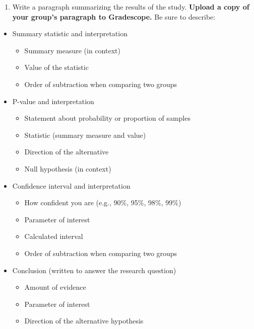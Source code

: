 \documentclass[
]{report}
\providecommand{\tightlist}{%
  \setlength{\itemsep}{0pt}\setlength{\parskip}{0pt}}
\begin{document}
\vspace{0.8in}

\begin{enumerate}
\def\labelenumi{\arabic{enumi}.}
\setcounter{enumi}{14}
\tightlist
\item
  Write a paragraph summarizing the results of the study. \textbf{Upload a copy of your group's paragraph to Gradescope.} Be sure to describe:
\end{enumerate}

\begin{itemize}
\item
  Summary statistic and interpretation

  \begin{itemize}
  \item
    Summary measure (in context)
  \item
    Value of the statistic
  \item
    Order of subtraction when comparing two groups
  \end{itemize}
\item
  P-value and interpretation

  \begin{itemize}
  \item
    Statement about probability or proportion of samples
  \item
    Statistic (summary measure and value)
  \item
    Direction of the alternative
  \item
    Null hypothesis (in context)
  \end{itemize}
\item
  Confidence interval and interpretation

  \begin{itemize}
  \item
    How confident you are (e.g., 90\%, 95\%, 98\%, 99\%)
  \item
    Parameter of interest
  \item
    Calculated interval
  \item
    Order of subtraction when comparing two groups
  \end{itemize}
\item
  Conclusion (written to answer the research question)

  \begin{itemize}
  \item
    Amount of evidence
  \item
    Parameter of interest
  \item
    Direction of the alternative hypothesis
  \end{itemize}
\end{itemize}
\end{document}

